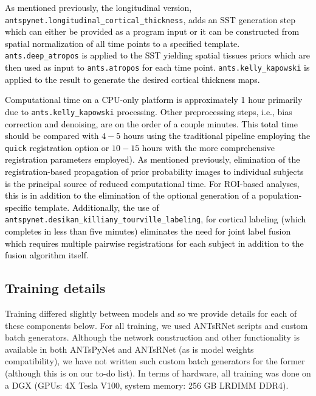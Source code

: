 \documentclass[12pt,]{article}
\begin{document}
\textcolor{black}{As mentioned previously, the longitudinal version,}
\texttt{antspynet.longitudinal\_cortical\_thickness},
\textcolor{black}{adds an SST
generation step which can either be provided as a program input or it can be
constructed from spatial normalization of all time points to a specified
template.} \texttt{ants.deep\_atropos}
\textcolor{black}{is applied to the SST
yielding spatial tissues priors which are then used as input to}
\texttt{ants.atropos} \textcolor{black}{for each time point. }
\texttt{ants.kelly\_kapowski}
\textcolor{black}{is applied to the result to generate the desired cortical
thickness maps.}

\textcolor{black}{Computational time on a CPU-only platform is approximately 1
hour primarily due to} \texttt{ants.kelly\_kapowski}
\textcolor{black}{processing.
Other preprocessing steps, i.e., bias correction and denoising, are on the order of a
couple minutes. This total time should be compared with $4-5$ hours
using the traditional pipeline employing the} \texttt{quick}
\textcolor{black}{registration option or $10-15$ hours with the more
comprehensive registration parameters employed).  As mentioned previously,
elimination of the registration-based propagation of prior probability images to
individual subjects is the principal source of reduced computational time. For
ROI-based analyses, this is in addition to the elimination of the optional
generation of a population-specific template. Additionally, the use of}
\texttt{antspynet.desikan\_killiany\_tourville\_labeling},
\textcolor{black}{for cortical
labeling (which completes in less than five minutes) eliminates the need for
joint label fusion which requires multiple pairwise registrations for each
subject in addition to the fusion algorithm itself.}

\hypertarget{training-details}{%
\subsection*{Training details}\label{training-details}}

Training differed slightly between models and so we provide details for
each of these components below. For all training, we used ANTsRNet
scripts and custom batch generators. Although the network construction
and other functionality is available in both ANTsPyNet and ANTsRNet (as
is model weights compatibility), we have not written such custom batch
generators for the former (although this is on our to-do list). In terms
of hardware, all training was done on a DGX (GPUs: 4X Tesla V100, system
memory: 256 GB LRDIMM DDR4).
\end{document}
